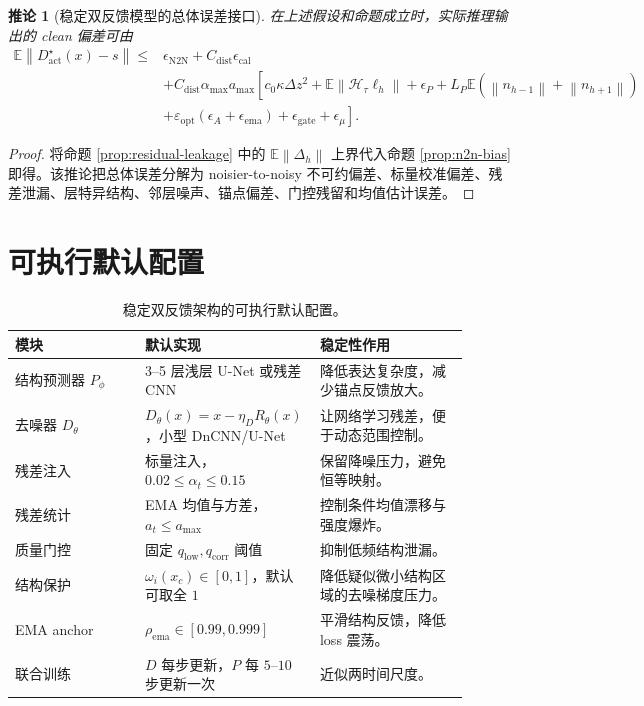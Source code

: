 \documentclass[11pt,a4paper,UTF8,fontset=fandol]{ctexart}
\newtheorem{corollary}[theorem]{推论}
\theoremstyle{definition}
\newcommand{\norm}[1]{\left\lVert#1\right\rVert}
\newcommand{\E}{\mathbb{E}}
\newcommand{\cH}{\mathcal{H}}
\begin{document}
\begin{corollary}[稳定双反馈模型的总体误差接口]
\label{cor:overall}
在上述假设和命题成立时，实际推理输出的 clean 偏差可由
\begin{equation}
\label{eq:overall-error}
\begin{aligned}
    \E\norm{D^\star_{\mathrm{act}}(x)-s}
    \le&
    \epsilon_{\mathrm{N2N}}
    +C_{\mathrm{dist}}\epsilon_{\mathrm{cal}}\\
    &+C_{\mathrm{dist}}\alpha_{\max}a_{\max}
    \left[
    c_0\kappa\Delta z^2
    +\E\norm{\cH_\tau\ell_h}
    +\epsilon_P
    +L_P\E(\norm{n_{h-1}}+\norm{n_{h+1}})\right.\\
    &\left.
    +\varepsilon_{\mathrm{opt}}(\epsilon_A+\epsilon_{\mathrm{ema}})
    +\epsilon_{\mathrm{gate}}
    +\epsilon_\mu
    \right].
\end{aligned}
\end{equation}
\end{corollary}

\begin{proof}
将命题 \ref{prop:residual-leakage} 中的 $\E\norm{\Delta_h}$ 上界代入命题 \ref{prop:n2n-bias} 即得。该推论把总体误差分解为 noisier-to-noisy 不可约偏差、标量校准偏差、残差泄漏、层特异结构、邻层噪声、锚点偏差、门控残留和均值估计误差。
\end{proof}

\section{可执行默认配置}

\begin{table}[htbp]
\centering
\small
\begin{tabular}{p{0.28\linewidth}p{0.30\linewidth}p{0.32\linewidth}}
\toprule
模块 & 默认实现 & 稳定性作用 \\
\midrule
结构预测器 $P_\phi$ & 3--5 层浅层 U-Net 或残差 CNN & 降低表达复杂度，减少锚点反馈放大。 \\
去噪器 $D_\theta$ & $D_\theta(x)=x-\eta_DR_\theta(x)$，小型 DnCNN/U-Net & 让网络学习残差，便于动态范围控制。 \\
残差注入 & 标量注入，$0.02\le\alpha_t\le0.15$ & 保留降噪压力，避免恒等映射。 \\
残差统计 & EMA 均值与方差，$a_t\le a_{\max}$ & 控制条件均值漂移与强度爆炸。 \\
质量门控 & 固定 $q_{\mathrm{low}},q_{\mathrm{corr}}$ 阈值 & 抑制低频结构泄漏。 \\
结构保护 & $\omega_i(x_c)\in[0,1]$，默认可取全 $1$ & 降低疑似微小结构区域的去噪梯度压力。 \\
EMA anchor & $\rho_{\mathrm{ema}}\in[0.99,0.999]$ & 平滑结构反馈，降低 loss 震荡。 \\
联合训练 & $D$ 每步更新，$P$ 每 $5$--$10$ 步更新一次 & 近似两时间尺度。 \\
\bottomrule
\end{tabular}
\caption{稳定双反馈架构的可执行默认配置。}
\label{tab:default-config}
\end{table}
\end{document}
